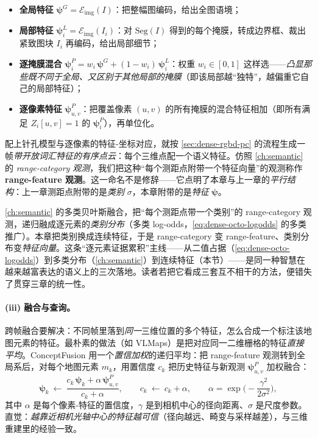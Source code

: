 \begin{itemize}
  \item \textbf{全局特征} $\boldsymbol\psi^{G}=\mathcal{E}_{\mathrm{img}}(I)$：把整幅图编码，给出全图语境；
  \item \textbf{局部特征} $\boldsymbol\psi_i^{L}=\mathcal{E}_{\mathrm{img}}(I_i)$：对 $\mathrm{Seg}(I)$ 得到的每个掩膜，转成边界框、裁出紧致图块 $I_i$ 再编码，给出局部细节；
  \item \textbf{逐掩膜混合} $\boldsymbol\psi_i^{P}=w_i\,\boldsymbol\psi^{G}+(1-w_i)\,\boldsymbol\psi_i^{L}$：权重 $w_i\in[0,1]$ 这样选——\emph{凸显那些既不同于全局、又区别于其他局部的掩膜}（即该局部越“独特”，越偏重它自己的局部特征）；
  \item \textbf{逐像素特征} $\boldsymbol\psi_{u,v}^{P}$：把覆盖像素 $(u,v)$ 的所有掩膜的混合特征相加（即所有满足 $Z_i[u,v]=1$ 的 $\boldsymbol\psi_i^{P}$），再单位化。
\end{itemize}

\noindent 配上针孔模型与逐像素的特征-坐标对应，就按 \cref{sec:dense-rgbd-pc} 的流程生成一帧\emph{带开放词汇特征的有序点云}：每个三维点配一个语义特征。仿照 \cref{ch:semantic} 的 \emph{range-category 观测}，我们把这种“每个测距点附带一个特征向量”的观测称作 \textbf{range-feature 观测}\cite{paull2026openworld}。这一命名不是修辞——它点明了本章与上一章的\emph{平行结构}：上一章测距点附带的是\emph{类别} $\sigma$，本章附带的是\emph{特征} $\boldsymbol\psi$。

\begin{insight}
\cref{ch:semantic} 的多类贝叶斯融合，把“每个测距点带一个类别”的 range-category 观测，递归融成逐元素的\emph{类别分布}（多类 log-odds，\cref{eq:dense-octo-logodds} 的多类推广）。本章把类别换成连续特征，于是 range-category 变 range-feature、类别分布变\emph{特征向量}。这条“逐元素证据累积”主线——从二值占据（\cref{eq:dense-octo-logodds}）到多类分布（\cref{ch:semantic}）到连续特征（本节）——是同一种智慧在越来越富表达的语义上的三次落地。读者若把它看成三套互不相干的方法，便错失了贯穿三章的统一性。
\end{insight}

\paragraph{(iii) 融合与查询。}
跨帧融合要解决：不同帧里落到\emph{同一}三维位置的多个特征，怎么合成一个标注该地图元素的特征。最朴素的做法（如 VLMaps）是把对应同一二维栅格的特征\emph{直接平均}\cite{paull2026openworld}。ConceptFusion 用一个\emph{置信加权}的递归平均：把 range-feature 观测转到全局系后，对每个地图元素 $m_k$，用置信度 $c_k$ 把历史特征与新观测 $\boldsymbol\psi_{u,v}^{P}$ 加权融合\cite{jatavallabhula2023conceptfusion}：
\begin{equation}
  \boldsymbol\psi_k\ \leftarrow\ \frac{c_k\,\boldsymbol\psi_k+\alpha\,\boldsymbol\psi_{u,v}^{P}}{c_k+\alpha},\qquad
  c_k\ \leftarrow\ c_k+\alpha,\qquad
  \alpha=\exp\!\Big(\!-\frac{\gamma^2}{2\sigma^2}\Big),
  \label{eq:ow-fusion}
\end{equation}
其中 $\alpha$ 是每个像素-特征的置信度，$\gamma$ 是到相机中心的径向距离、$\sigma$ 是尺度参数。直觉：\emph{越靠近相机光轴中心的特征越可信}（径向越远、畸变与采样越差），与三维重建里的经验一致。

